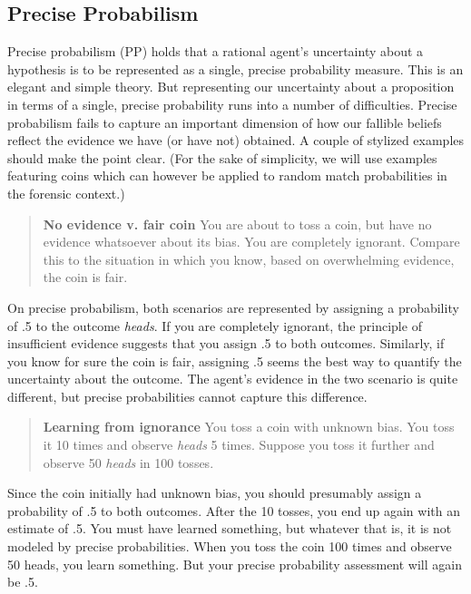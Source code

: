 \documentclass[
  10pt,
  dvipsnames,enabledeprecatedfontcommands]{scrartcl}
\begin{document}
\hypertarget{precise-probabilism}{%
\subsection{Precise Probabilism}\label{precise-probabilism}}

Precise probabilism (\textsf{PP}) holds that a rational agent's
uncertainty about a hypothesis is to be represented as a single, precise
probability measure. This is an elegant and simple theory. But
representing our uncertainty about a proposition in terms of a single,
precise probability runs into a number of difficulties. Precise
probabilism fails to capture an important dimension of how our fallible
beliefs reflect the evidence we have (or have not) obtained. A couple of
stylized examples should make the point clear. (For the sake of
simplicity, we will use examples featuring coins which can however be
applied to random match probabilities in the forensic context.)

\begin{quote}
\textbf{No evidence v. fair coin}
You are about to toss a coin, but have no evidence 
whatsoever about its bias. You are completely ignorant. 
Compare this to the situation in which you know, 
based on overwhelming evidence, the coin is fair. 
\end{quote}

\noindent On precise probabilism, both scenarios are represented by
assigning a probability of .5 to the outcome \emph{heads}. If you are
completely ignorant, the principle of insufficient evidence suggests
that you assign .5 to both outcomes. Similarly, if you know for sure the
coin is fair, assigning .5 seems the best way to quantify the
uncertainty about the outcome. The agent's evidence in the two scenario
is quite different, but precise probabilities cannot capture this
difference.

\begin{quote}
\textbf{Learning from ignorance}
You toss a coin with unknown bias. You toss it 10 times and observe \emph{heads} 5 times. Suppose you toss it further and observe 50 \emph{heads} in 100 tosses. 
\end{quote}

\noindent Since the coin initially had unknown bias, you should
presumably assign a probability of .5 to both outcomes. After the 10
tosses, you end up again with an estimate of .5. You must have learned
something, but whatever that is, it is not modeled by precise
probabilities. When you toss the coin 100 times and observe 50 heads,
you learn something. But your precise probability assessment will again
be .5.
\end{document}
